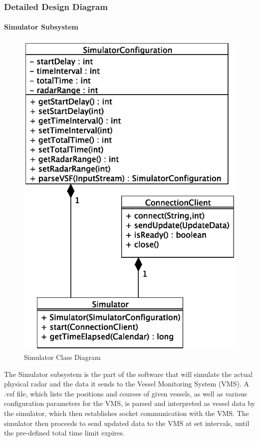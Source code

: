\documentclass{article}
\begin{document}
\subsubsection{Detailed Design Diagram} %

\paragraph{Simulator Subsystem} 

\begin{figure}[!htb]
\caption{Simulator Class Diagram}
\centering
\includegraphics[scale=0.6]{diagrams/simulator-class-diagram.eps}
\end{figure}

The Simulator subsystem is the part of the software that will simulate the actual physical radar and the data it sends to the Vessel Monitoring System (VMS). A .vsf file, which lists the positions and courses of given vessels, as well as various configuration parameters for the VMS, is parsed and interpreted as vessel data by the simulator, which then establishes socket communication with the VMS. The simulator then proceeds to send updated data to the VMS at set intervals, until the pre-defined total time limit expires.
\end{document}
